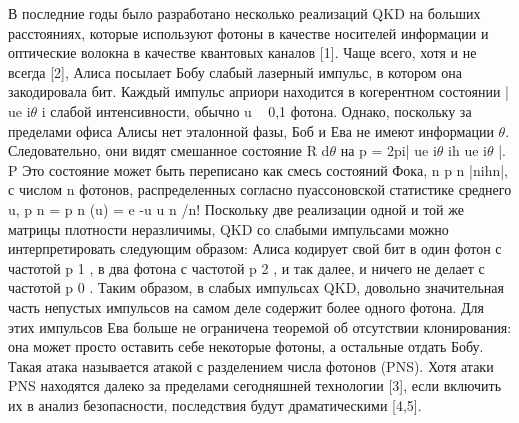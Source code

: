 В последние годы было разработано несколько реализаций QKD на больших расстояниях, которые используют фотоны в качестве носителей информации и оптические волокна в качестве квантовых каналов [1]. Чаще всего, хотя и не всегда [2], Алиса посылает Бобу слабый лазерный импульс, в котором она закодировала бит. Каждый импульс априори находится в когерентном состоянии | ue i$\theta$ i слабой интенсивности, обычно u ~ 0,1 фотона. Однако, поскольку за пределами офиса Алисы нет эталонной фазы, Боб и Ева не имеют информации $\theta$. Следовательно, они видят смешанное состояние R d$\theta$ на p = 2pi| ue i$\theta$ ih ue i$\theta$ |. P Это состояние может быть переписано как смесь состояний Фока, n p n |nihn|, с числом n фотонов, распределенных согласно пуассоновской статистике среднего u, p n = p n (u) = e -u u n /n! Поскольку две реализации одной и той же матрицы плотности неразличимы, QKD со слабыми импульсами можно интерпретировать следующим образом: Алиса кодирует свой бит в один фотон с частотой p 1 , в два фотона с частотой p 2 , и так далее, и ничего не делает с частотой p 0 . Таким образом, в слабых импульсах QKD, довольно значительная часть непустых импульсов на самом деле содержит более одного фотона. Для этих импульсов Ева больше не ограничена теоремой об отсутствии клонирования: она может просто оставить себе некоторые фотоны, а остальные отдать Бобу. Такая атака называется атакой с разделением числа фотонов (PNS). Хотя атаки PNS находятся далеко за пределами сегодняшней технологии [3], если включить их в анализ безопасности, последствия будут драматическими [4,5].


